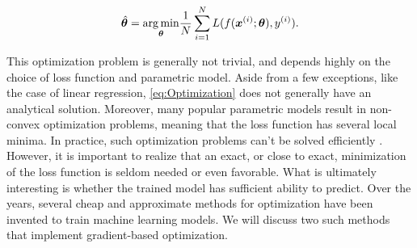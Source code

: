 \begin{equation}\label{eq:Optimization}
    \hat{\boldsymbol{\theta}} = \underset{\boldsymbol{\theta}}{\operatorname*{arg\,min}} \frac{1}{N}\sum_{i=1}^{N} L(f(\boldsymbol{x}^{(i)}; \boldsymbol{\theta}) , y^{(i)}).
\end{equation}

This optimization problem is generally not trivial, and depends highly on the choice of loss function and parametric model. Aside from a few exceptions, like the case of linear regression, \cref{eq:Optimization} does not generally have an analytical solution. Moreover, many popular parametric models result in non-convex optimization problems, meaning that the loss function has several local minima. In practice, such optimization problems can't be solved efficiently \cite{Vava:book}. However, it is important to realize that an exact, or close to exact, minimization of the loss function is seldom needed or even favorable. What is ultimately interesting is whether the trained model has sufficient ability to predict. Over the years, several cheap and approximate methods for optimization have been invented to train machine learning models. We will discuss two such methods that implement gradient-based optimization. 






